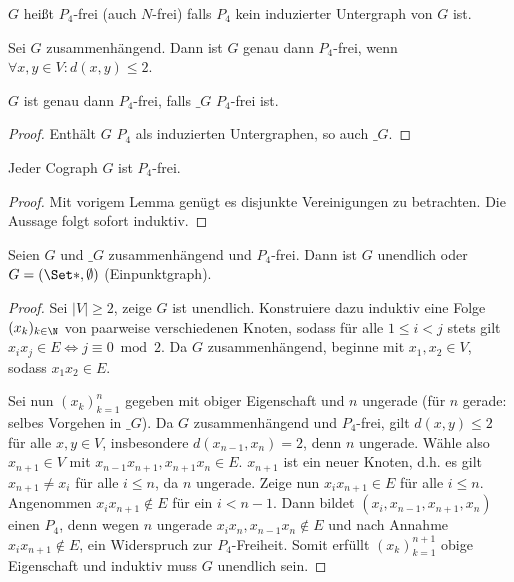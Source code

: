 
\begin{df}
    $G$ heißt $P_4$-frei (auch $N$-frei) falls $P_4$ kein induzierter Untergraph von $G$ ist.
\end{df}

\begin{lem}
    Sei $G$ zusammenhängend.
    Dann ist $G$ genau dann $P_4$-frei, wenn $\forall x,y \in V: d(x,y) \le 2$.
\end{lem}

\begin{lem}
    $G$ ist genau dann $P_4$-frei, falls $\_G$ $P_4$-frei ist.
    \begin{proof}
        Enthält $G$ $P_4$ als induzierten Untergraphen, so auch $\_G$.
    \end{proof}
\end{lem}

\begin{kor}
    Jeder Cograph $G$ ist $P_4$-frei.
    \begin{proof}
        Mit vorigem Lemma genügt es disjunkte Vereinigungen zu betrachten.
        Die Aussage folgt sofort induktiv.
    \end{proof}
\end{kor}

\begin{st}
    Seien $G$ und $\_G$ zusammenhängend und $P_4$-frei.
    Dann ist $G$ unendlich oder $G = (\Set \ast, \emptyset)$ (Einpunktgraph).
    \begin{proof}
        Sei $|V| \ge 2$, zeige $G$ ist unendlich.
        Konstruiere dazu induktiv eine Folge $(x_k)_{k\in\N}$ von paarweise verschiedenen Knoten, sodass für alle $1 \le i < j$ stets gilt
        \begin{math}
            x_ix_j \in E \iff j \equiv 0 \bmod 2.
        \end{math}
        Da $G$ zusammenhängend, beginne mit $x_1, x_2 \in V$, sodass $x_1 x_2 \in E$.

        Sei nun $(x_k)_{k=1}^n$ gegeben mit obiger Eigenschaft und $n$ ungerade (für $n$ gerade: selbes Vorgehen in $\_G$).
        Da $G$ zusammenhängend und $P_4$-frei, gilt $d(x,y) \le 2$ für alle $x,y \in V$, insbesondere $d(x_{n-1}, x_n) = 2$, denn $n$ ungerade.
        Wähle also $x_{n+1} \in V$ mit $x_{n-1}x_{n+1}, x_{n+1} x_n \in E$.
        $x_{n+1}$ ist ein neuer Knoten, d.h. es gilt $x_{n+1} \neq x_i$ für alle $i \le n$, da $n$ ungerade.
        Zeige nun $x_i x_{n+1} \in E$ für alle $i \le n$.
        Angenommen $x_i x_{n+1} \notin E$ für ein $i < n - 1$.
        Dann bildet $(x_i, x_{n-1}, x_{n+1}, x_n)$ einen $P_4$, denn wegen $n$ ungerade $x_i x_n, x_{n-1} x_n \notin E$ und nach Annahme $x_i x_{n+1} \notin E$, ein Widerspruch zur $P_4$-Freiheit.
        Somit erfüllt $(x_k)_{k=1}^{n+1}$ obige Eigenschaft und induktiv muss $G$ unendlich sein.
    \end{proof}
\end{st}

